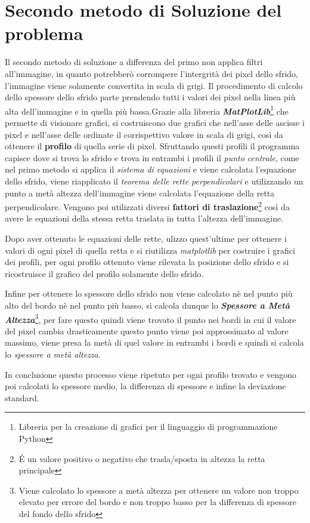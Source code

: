 \documentclass[a4paper, notitlepage, 12pt]{article}
\begin{document}
    \section{Secondo metodo di Soluzione del problema}
    \noindent Il secondo metodo di soluzione a differenza del primo non applica filtri all'immagine, in quanto potrebberò corrompere l'intergrità
    dei pixel dello sfrido, l'immagine viene solamente convertita in scala di grigi. Il procedimento di calcolo dello spessore dello sfrido parte prendendo tutti i valori dei pixel nella linea più alta 
    dell'immagine e in quella più bassa.Grazie alla libreria \emph{\textbf{MatPlotLib}}\footnote[9]{\indent Libreria per la creazione di grafici per il linguaggio di programmazione Python} che permette di visionare grafici, si costruiscono due grafici che nell'asse delle ascisse i pixel e nell'asse delle ordinate
    il corrispettivo valore in scala di grigi, così da ottenere il \textbf{profilo} di quella serie di pixel. Sfruttando questi profili il programma capisce dove si trova lo sfrido e trova in entrambi i profili
    il \emph{punto centrale}, come nel primo metodo si applica il \emph{sistema di equazioni} e viene calcolata l'equazione dello sfrido, viene riapplicato il \emph{teorema delle rette perpendicolari} e utilizzando un punto a metà altezza dell'immagine
    viene calcolata l'equazione della retta perpendicolare. Vengono poi utilizzati diversi \textbf{fattori di traslazione}\footnote[10]{\indent \'E un valore positivo o negativo che trasla/sposta in altezza la retta principale} così da avere le equazioni della stessa retta traslata in tutta l'altezza
    dell'immagine.\par
    \noindent Dopo aver ottenuto le equazioni delle rette, ulizzo quest'ultime per ottenere i valori di ogni pixel di quella retta e si riutilizza \emph{matplotlib} per costruire i grafici dei profili, 
    per ogni profilo ottenuto viene rilevata la posizione dello sfrido e si ricostruisce il grafico del profilo solamente dello sfrido.\par
    \pagebreak
    \thispagestyle{plain}
    \noindent
    Infine per ottenere lo spessore dello sfrido non viene calcolato nè nel punto più alto del bordo
    nè nel punto più basso, si calcola dunque lo \emph{\textbf{Spessore a Metà Altezza}}\footnote[11]{\indent Viene calcolato lo spessore a metà altezza per ottenere un valore non troppo elevato per errore del bordo e non troppo basso per la differenza di spessore del fondo dello sfrido}, per fare questo quindi viene trovato il punto nei bordi in cui il valore del pixel cambia drasticamente
    questo punto viene poi approssimato al valore massimo, viene presa la metà di quel valore in entrambi i bordi e quindi si calcola lo \emph{spessore a metà altezza}.\par
    \noindent In conclusione questo processo viene ripetuto per ogni profilo trovato e vengono poi calcolati lo spessore medio, la differenza di spessore e infine la deviazione standard.
\end{document}
